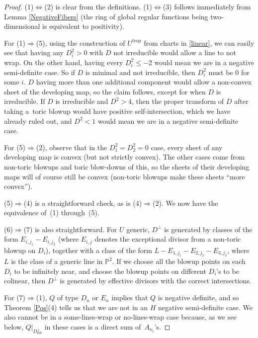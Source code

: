 \documentclass[11pt]{article}
\numberwithin{equation}{section}
\numberwithin{figure}{section}
\numberwithin{table}{section}
\DeclareMathOperator{\trop}{trop}
\DeclareMathOperator{\Eff}{Eff}
\let\bb=\mathbb
\theoremstyle{definition}
\begin{document}
\begin{proof}(1)$\Leftrightarrow$(2) is clear from the definitions. (1)$\Leftrightarrow$(3) follows immediately from Lemma \ref{NegativeFibers} (the ring of global regular functions being two-dimensional is equivalent to positivity).

For (1)$\Rightarrow$(5), using the construction of $U^{\trop}$ from charts in \eqref{linear}, we can easily see that having any $D_i^2>0$ with $D$ not irreducible would allow a line to not wrap. On the other hand, having every $D_i^2 \leq -2$ would mean we are in a negative semi-definite case. So if $D$ is minimal and not irreducible, then $D_i^2$ must be $0$ for some $i$. $D$ having more than one additional component would allow a non-convex sheet of the developing map, so the claim follows, except for when $D$ is irreducible. If $D$ is irreducible and $D^2 > 4$, then the proper transform of $D$ after taking a~toric blowup would have positive self-intersection, which we have already ruled out, and $D^2<1$ would mean we are in a negative semi-definite case.

For (5)$\Rightarrow$(2), observe that in the $D_1^2=D_2^2=0$ case, every sheet of any developing map is convex (but not strictly convex). The other cases come from non-toric blowups and toric blow-downs of this, so the sheets of their developing maps will of course still be convex (non-toric blowups make these sheets ``more convex'').

(5)$\Rightarrow$(4) is a straightforward check, as is (4)$\Rightarrow$(2). We now have the equivalence of~(1) through~(5).

(6)$\Rightarrow$(7) is also straightforward. For $U$ generic, $D^{\perp}$ is generated by classes of the form $E_{i,j_1}-E_{i,j_2}$ (where $E_{i,j}$ denotes the exceptional divisor from a non-toric blowup on $D_i$), together with a class of the form $L-E_{1,j_1} - E_{2,j_2} - E_{3,j_3}$, where $L$ is the class of a generic line in $\bb{P}^2$. If we choose all the blowup points on each $D_i$ to be infinitely near, and choose the blowup points on different $D_i$'s to be colinear, then $D^{\perp}$ is generated by effective divisors with the correct intersections.

For (7)$\Rightarrow$(1), $Q$ of type $D_n$ or $E_n$ implies that $Q$ is negative definite, and so Theorem \ref{Pos}(4) tells us that we are not in an $H$ negative semi-definite case. We also cannot be in a some-lines-wrap or no-lines-wrap case because, as we see below, $Q|_{D^{\perp}_{\Eff}}$ in these cases is a direct sum of~$A_{n_i}$'s.


\end{proof}
\end{document}
